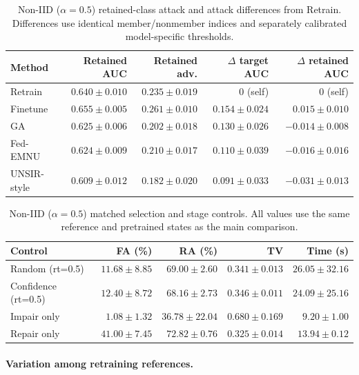 \begin{table}[H]\centering\small
\caption{Non-IID ($\alpha=0.5$) retained-class attack and attack differences from Retrain. Differences use identical member/nonmember indices and separately calibrated model-specific thresholds.}
\label{tab:noniid-attack}
\begin{tabular}{lrrrr}\toprule Method & Retained AUC & Retained adv. & $\Delta$ target AUC & $\Delta$ retained AUC\\\midrule
Retrain & $0.640 \pm 0.010$ & $0.235 \pm 0.019$ & 0 (self) & 0 (self)\\
Finetune & $0.655 \pm 0.005$ & $0.261 \pm 0.010$ & $0.154 \pm 0.024$ & $0.015 \pm 0.010$\\
GA & $0.625 \pm 0.006$ & $0.202 \pm 0.018$ & $0.130 \pm 0.026$ & $-0.014 \pm 0.008$\\
Fed-EMNU & $0.624 \pm 0.009$ & $0.210 \pm 0.017$ & $0.110 \pm 0.039$ & $-0.016 \pm 0.016$\\
UNSIR-style & $0.609 \pm 0.012$ & $0.182 \pm 0.020$ & $0.091 \pm 0.033$ & $-0.031 \pm 0.013$\\
\bottomrule\end{tabular}\end{table}

\begin{table}[H]\centering\small
\caption{Non-IID ($\alpha=0.5$) matched selection and stage controls. All values use the same reference and pretrained states as the main comparison.}
\label{tab:noniid-controls}
\begin{tabular}{lrrrr}\toprule Control & FA (\%) & RA (\%) & TV & Time (s)\\\midrule
Random (rt=0.5) & $11.68 \pm 8.85$ & $69.00 \pm 2.60$ & $0.341 \pm 0.013$ & $26.05 \pm 32.16$\\
Confidence (rt=0.5) & $12.40 \pm 8.72$ & $68.16 \pm 2.73$ & $0.346 \pm 0.011$ & $24.09 \pm 25.16$\\
Impair only & $1.08 \pm 1.32$ & $36.78 \pm 22.04$ & $0.680 \pm 0.169$ & $9.20 \pm 1.00$\\
Repair only & $41.00 \pm 7.45$ & $72.82 \pm 0.76$ & $0.325 \pm 0.014$ & $13.94 \pm 0.12$\\
\bottomrule\end{tabular}\end{table}
\paragraph{Variation among retraining references.}

